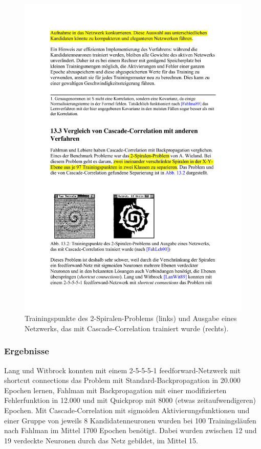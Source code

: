 \begin{figure}[ht!] \centering 
	\includegraphics[width=\linewidth]{figures/ch06_2-spiralen-problem.pdf}
	\caption{Trainingspunkte des 2-Spiralen-Problems (links) und Ausgabe eines Netzwerks, das mit Cascade-Correlation trainiert wurde (rechts).}
	\label{fig:ch06_2-spiralen-problem}
\end{figure}

\subsubsection*{Ergebnisse}
Lang und Witbrock konnten mit einem 2-5-5-5-1 feedforward-Netzwerk mit shortcut connections das Problem mit Standard-Backpropagation in 20.000 Epochen lernen, Fahlman mit Backpropagation mit einer modifizierten Fehlerfunktion in 12.000 und mit Quickprop mit 8000 (etwas zeitaufwendigeren) Epochen.
Mit Cascade-Correlation mit sigmoiden Aktivierungsfunktionen und einer Gruppe von jeweils 8 Kandidatenneuronen wurden bei 100 Trainingsläufen nach Fahlman im Mittel 1700 Epochen benötigt. Dabei wurden zwischen 12 und 19 verdeckte Neuronen durch das Netz gebildet, im Mittel 15.

